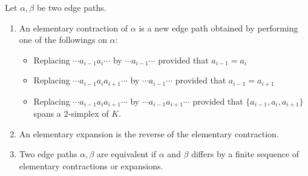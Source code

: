 \begin{definition}
Let $\alpha,\beta$ be two edge paths.
\begin{enumerate}
\item
An elementary contraction of $\alpha$ is a new edge path obtained by performing one of the followings on $\alpha$:
\begin{itemize}
\item
Replacing $\cdots a_{i-1}a_i\cdots$ by $\cdots a_{i-1}\cdots$ provided that $a_{i-1}=a_i$
\item
Replacing $\cdots a_{i-1}a_ia_{i+1}\cdots$ by $\cdots a_{i-1}\cdots$ provided that $a_{i-1}=a_{i+1}$
\item
Replacing $\cdots a_{i-1}a_ia_{i+1}\cdots$ by $\cdots a_{i-1}a_{i+1}\cdots$ provided that $\{a_{i-1},a_i,a_{i+1}\}$ spans a $2$-simplex of $K$.
\end{itemize}
\item
An elementary expansion is the reverse of the elementary contraction.
\item
Two edge paths $\alpha,\beta$ are equivalent if $\alpha$ and $\beta$ differs by a finite sequence of elementary contractions or expansions.
\end{enumerate}
\end{definition}















